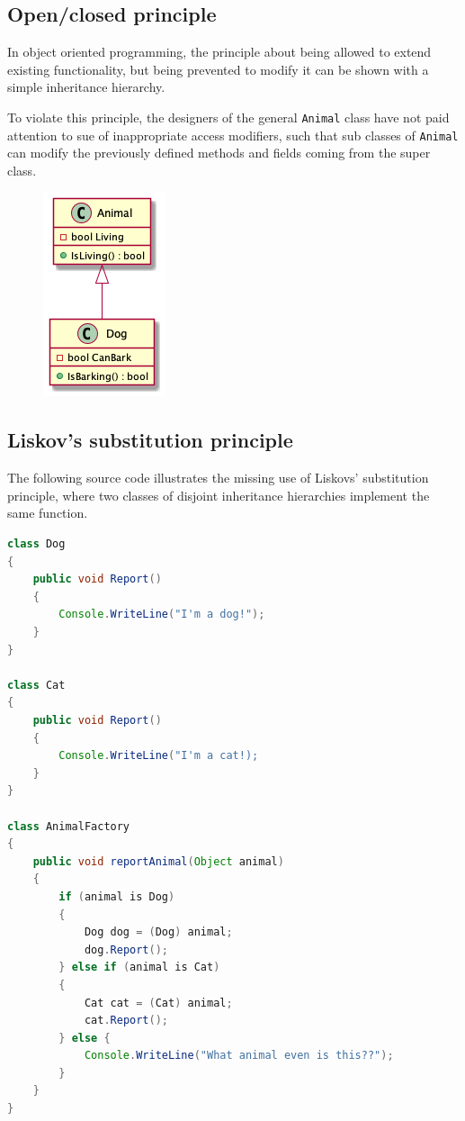\documentclass[12pt,letterpaper]{article}
\begin{document}
\subsection*{Open/closed principle}

In object oriented programming, the principle about being allowed to extend existing functionality, but being prevented to modify it can be shown with a simple inheritance hierarchy.

To violate this principle, the designers of the general \texttt{Animal} class have not paid attention to sue of inappropriate access modifiers, such that sub classes of \texttt{Animal} can modify the previously defined methods and fields coming from the super class.

\begin{figure}[h]
    \centering
    \includegraphics[scale=0.65]{../out/Documents/plantuml/exercise4_open_closed/exercise4_open_closed.png}
    \caption{}
\end{figure}

\subsection*{Liskov's substitution principle}

The following source code illustrates the missing use of Liskovs' substitution principle, where two classes of disjoint inheritance hierarchies implement the same function.

\begin{lstlisting}[language=Java]
class Dog
{
    public void Report()
    {
        Console.WriteLine("I'm a dog!");
    }
}

class Cat
{
    public void Report()
    {
        Console.WriteLine("I'm a cat!);
    }
}

class AnimalFactory
{
    public void reportAnimal(Object animal)
    {
        if (animal is Dog)
        {
            Dog dog = (Dog) animal;
            dog.Report();
        } else if (animal is Cat)
        {
            Cat cat = (Cat) animal;
            cat.Report();
        } else {
            Console.WriteLine("What animal even is this??");
        }
    }
}
\end{lstlisting}
\end{document}
